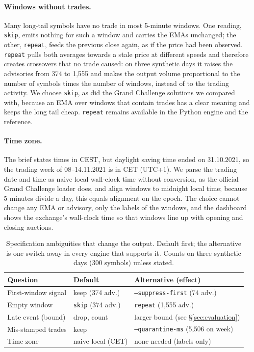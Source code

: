 \paragraph{Windows without trades.}
Many long-tail symbols have no trade in most 5-minute windows.
One reading, \texttt{skip}, emits nothing for such a window and carries the EMAs unchanged; the other, \texttt{repeat}, feeds the previous close again, as if the price had been observed.
\texttt{repeat} pulls both averages towards a stale price at different speeds and therefore creates crossovers that no trade caused: on three synthetic days it raises the advisories from 374 to 1,555 and makes the output volume proportional to the number of symbols times the number of windows, instead of to the trading activity.
We choose \texttt{skip}, as did the Grand Challenge solutions we compared with, because an EMA over windows that contain trades has a clear meaning and keeps the long tail cheap.
\texttt{repeat} remains available in the Python engine and the reference.

\paragraph{Time zone.}
The brief states times in CEST, but daylight saving time ended on 31.10.2021, so the trading week of 08--14.11.2021 is in CET (UTC+1).
We parse the trading date and time as naive local wall-clock time without conversion, as the official Grand Challenge loader does, and align windows to midnight local time; because 5 minutes divide a day, this equals alignment on the epoch.
The choice cannot change any EMA or advisory, only the labels of the windows, and the dashboard shows the exchange's wall-clock time so that windows line up with opening and closing auctions.

\begin{table}[t]
  \caption{Specification ambiguities that change the output. Default first; the alternative is one switch away in every engine that supports it. Counts on three synthetic days (300 symbols) unless stated.}
  \label{tab:design-space}
  \small
  \begin{tabular}{@{}lll@{}}
    \toprule
    Question & Default & Alternative (effect) \\
    \midrule
    First-window signal & keep (374 adv.) & \texttt{--suppress-first} (74 adv.) \\
    Empty window & \texttt{skip} (374 adv.) & \texttt{repeat} (1,555 adv.) \\
    Late event (bound) & drop, count & larger bound (see §\ref{sec:evaluation}) \\
    Mis-stamped trades & keep & \texttt{--quarantine-ms} (5,506 on week) \\
    Time zone & naive local (CET) & none needed (labels only) \\
    \bottomrule
  \end{tabular}
\end{table}
